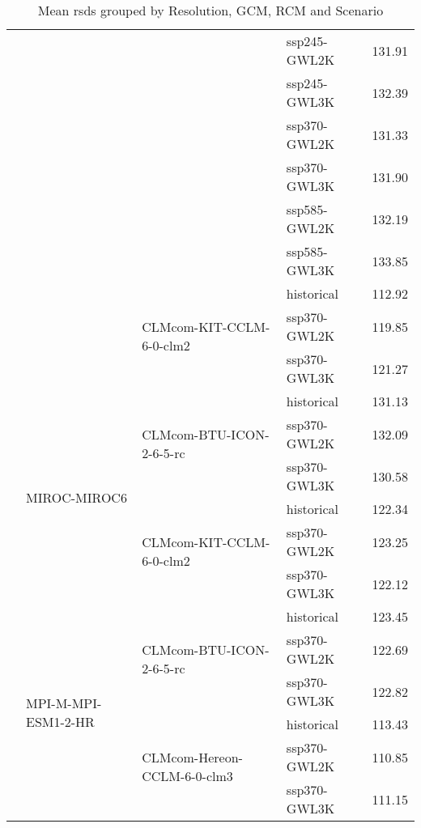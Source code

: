 \begin{table}[htbp]
{\begin{tabular}{lll|l|r}
 &  &  & ssp245-GWL2K & 131.91 \\
 &  &  & ssp245-GWL3K & 132.39 \\
 &  &  & ssp370-GWL2K & 131.33 \\
 &  &  & ssp370-GWL3K & 131.90 \\
 &  &  & ssp585-GWL2K & 132.19 \\
 &  &  & ssp585-GWL3K & 133.85 \\
\cmidrule(lr){3-5}
 &  & \multirow{3}{*}{CLMcom-KIT-CCLM-6-0-clm2} & historical & 112.92 \\
 &  &  & ssp370-GWL2K & 119.85 \\
 &  &  & ssp370-GWL3K & 121.27 \\
\cmidrule(lr){3-5}
\cmidrule(lr){2-5}
 & \multirow{6}{*}{MIROC-MIROC6} & \multirow{3}{*}{CLMcom-BTU-ICON-2-6-5-rc} & historical & 131.13 \\
 &  &  & ssp370-GWL2K & 132.09 \\
 &  &  & ssp370-GWL3K & 130.58 \\
\cmidrule(lr){3-5}
 &  & \multirow{3}{*}{CLMcom-KIT-CCLM-6-0-clm2} & historical & 122.34 \\
 &  &  & ssp370-GWL2K & 123.25 \\
 &  &  & ssp370-GWL3K & 122.12 \\
\cmidrule(lr){3-5}
\cmidrule(lr){2-5}
 & \multirow{6}{*}{MPI-M-MPI-ESM1-2-HR} & \multirow{3}{*}{CLMcom-BTU-ICON-2-6-5-rc} & historical & 123.45 \\
 &  &  & ssp370-GWL2K & 122.69 \\
 &  &  & ssp370-GWL3K & 122.82 \\
\cmidrule(lr){3-5}
 &  & \multirow{3}{*}{CLMcom-Hereon-CCLM-6-0-clm3} & historical & 113.43 \\
 &  &  & ssp370-GWL2K & 110.85 \\
 &  &  & ssp370-GWL3K & 111.15 \\
\bottomrule
\end{tabular}
}
\label{Table:rsds_mean_values}
\caption{Mean rsds grouped by Resolution, GCM, RCM and Scenario}
\end{table}
